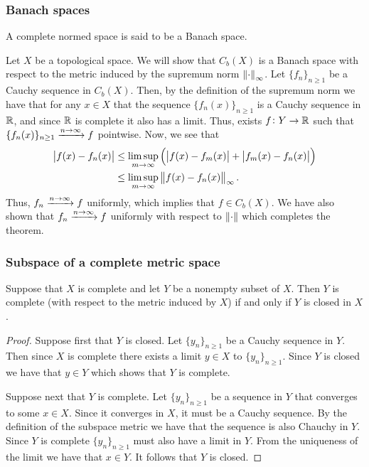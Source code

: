 \documentclass[11pt,a4paper]{article}
\begin{document}
\subsubsection{Banach spaces}

\begin{definition}
  A complete normed space is said to be a Banach space.
\end{definition}

\begin{example}
  Let $X$ be a topological space. We will show that $C_b(X)$ is a Banach
  space with respect to the metric induced by the supremum norm 
  $\left\lVert\cdot\right\rVert_{\infty}$. Let $\{f_n\}_{n \geq 1}$ be a Cauchy sequence
  in $C_b(X)$. Then, by the definition of the supremum norm we have that
  for any $x \in X$ that the sequence $\{f_n(x)\}_{n \geq 1}$ is a Cauchy
  sequence in $\mathbb{R}$, and since $\mathbb{R}$ is complete it also has a limit.
  Thus, exists $f \colon Y \to \mathbb{R}$ such that 
  $\{f_n(x)\}_{n \geq 1} \xrightarrow{n \to \infty} f$ pointwise.
  Now, we see that
  \begin{align*}
    \abs{f(x) - f_n(x)} &\le
    \limsup_{m \to \infty}\del{\abs{f(x) - f_m(x)} + \abs{f_m(x) - f_n(x)}} \\
    &\le \limsup_{m \to \infty} \norm{f(x) - f_n(x)}_{\infty}.
  \end{align*}
  Thus, $f_n \xrightarrow{n \to \infty} f$ uniformly,
  which implies that $f \in C_b(X)$. We have also shown that
  $f_n \xrightarrow{n \to \infty} f$ uniformly with respect to $\left\lVert\cdot\right\rVert$
  which completes the theorem.
\end{example}

\subsubsection{Subspace of a complete metric space}

\begin{proposition}
  Suppose that $X$ is complete and let $Y$ be a nonempty subset of $X$. 
  Then $Y$ is complete (with respect to the metric induced by $X$) if and 
  only if $Y$ is closed in $X$.
\end{proposition}
\begin{proof}
  Suppose first that $Y$ is closed. Let $\{y_n\}_{n \geq 1}$ be a Cauchy
  sequence in $Y$. Then since $X$ is complete there exists a limit $y \in X$
  to $\{y_n\}_{n \geq 1}$. Since $Y$ is closed we have that $y \in Y$
  which shows that $Y$ is complete.

  Suppose next that $Y$ is complete. Let $\{y_n\}_{n \geq 1}$ be a sequence
  in $Y$ that converges to some $x \in X$. Since it converges in $X$,
  it must be a Cauchy sequence. By the definition of the subspace metric
  we have that the sequence is also Chauchy in $Y$. Since $Y$ is complete
  $\{y_n\}_{n \geq 1}$ must also have a limit in $Y$. From the uniqueness
  of the limit we have that $x \in Y$. It follows that $Y$ is closed.
\end{proof}
\end{document}
